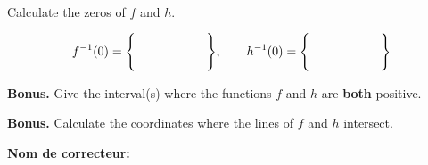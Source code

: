 \documentclass[8pt]{exam}
\begin{document}
\begin{questions}
\

\question[3] Calculate the zeros of $f$ and $h$.
\fillwithdottedlines{21mm}

$$ f^{-1}(0) = \Bigg\{ \hspace{20mm} \Bigg\}, \qquad h^{-1}(0) = \Bigg\{ \hspace{20mm} \Bigg\}$$

\question[0] \textbf{Bonus.} Give the interval(s) where the functions $f$ and $h$ are \textbf{both} positive. 

\question[0] \textbf{Bonus.} Calculate the coordinates where the lines of $f$ and $h$ intersect.

\vfill

\end{questions}

\begin{tcolorbox}

\textbf{Nom de correcteur:}

\begin{center}
\gradetable[h][questions]
\end{center}

\end{tcolorbox}
\end{document}
